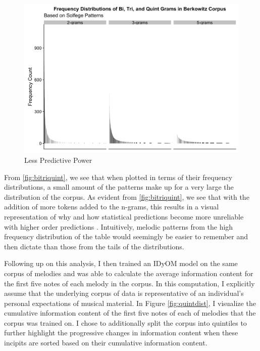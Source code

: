 \documentclass[12pt,]{book}
\begin{document}
\begin{figure}

{\centering \includegraphics[width=1\linewidth]{img/bitriquint} 

}

\caption{Less Predictive Power}\label{fig:bitriquint2}
\end{figure}

From \ref{fig:bitriquint}, we see that when plotted in terms of their frequency distributions, a small amount of the patterns make up for a very large the distribution of the corpus.
As evident from \ref{fig:bitriquint}, we see that with the addition of more tokens added to the n-grams, this results in a visual representation of why and how statistical predictions become more unreliable with higher order predictions \citep{conklinMultipleViewpointSystems1995}.
Intuitively, melodic patterns from the high frequency distribution of the table would seemingly be easier to remember and then dictate than those from the tails of the distributions.

Following up on this analysis, I then trained an IDyOM model on the same corpus of melodies and was able to calculate the average information content for the first five notes of each melody in the corpus.
In this computation, I explicitly assume that the underlying corpus of data is representative of an individual's personal expectations of musical material.
In Figure \ref{fig:quintdist}, I visualize the cumulative information content of the first five notes of each of melodies that the corpus was trained on.
I chose to additionally split the corpus into quintiles to further highlight the progressive changes in information content when these incipits are sorted based on their cumulative information content.
\end{document}
